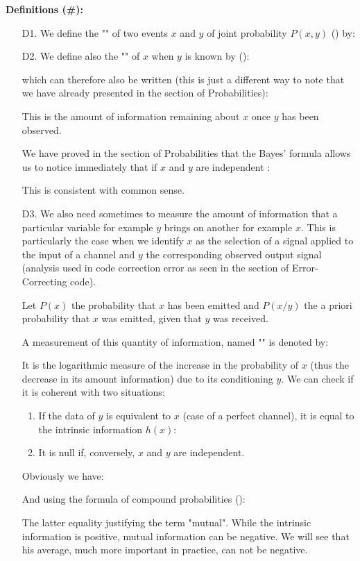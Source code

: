 	\textbf{Definitions (\#\mydef):}
	\begin{enumerate}
		\item[D1.] We define the "" of two events $x$ and $y$ of joint probability $P(x, y)$ () by:
		
		\item[D2.] We define also the "" of $x$ when $y$ is known by ():
		
		which can therefore also be written (this is just a different way to note that we have already presented in the section of Probabilities):
		
		This is the amount of information remaining about $x$ once $y$ has been observed. 
		
		We have proved in the section of Probabilities that the Bayes' formula allows us to notice immediately that if $x$ and $y$ are independent :
		
		This is consistent with common sense.
		
		\item[D3.] We also need sometimes to measure the amount of information that a particular variable for example $y$ brings on another for example $x$. This is particularly the case when we identify $x$ as the selection of a signal applied to the input of a channel and $y$ the corresponding observed output signal (analysis used in code correction error as seen in the section of Error-Correcting code).
		
		Let $P(x)$ the probability that $x$ has been emitted and $P(x/y)$ the a priori probability that $x$ was emitted, given that  $y$ was received.
		
		A measurement of this quantity of information, named "" is denoted by:
		
		It is the logarithmic measure of the increase in the probability of $x$ (thus the decrease in its amount information) due to its conditioning $y$. We can check if it is coherent with two situations:
		\begin{enumerate}
			\item If the data of $y$ is equivalent to $x$ (case of a perfect channel), it is equal to the intrinsic information $h (x)$:
			
			\item It is null if, conversely, $x$ and $y$ are independent.
			
		\end{enumerate}
		Obviously we have:
		
		And using the formula of compound probabilities ():
		
		The latter equality justifying the term "mutual". While the intrinsic information is positive, mutual information can be negative. We will see that his average, much more important in practice, can not be negative.
	\end{enumerate}
